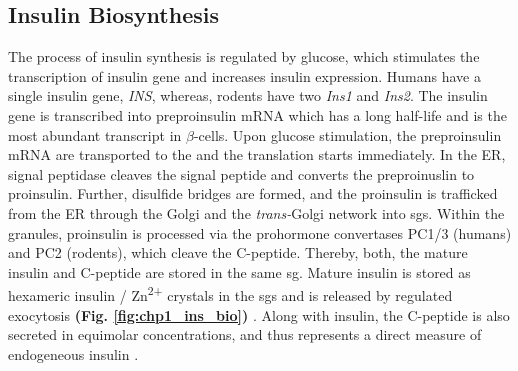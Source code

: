 \subsection{Insulin Biosynthesis} %
\label{sec:insbio}

The process of insulin synthesis is regulated by glucose, which stimulates the transcription of insulin gene and increases insulin  expression. Humans have a single insulin gene, \textit{INS}, whereas, rodents have two \textit{Ins1} and \textit{Ins2}. The insulin gene is transcribed into preproinsulin mRNA which has a long half-life and is the most abundant transcript in $\beta$-cells. Upon glucose stimulation, the preproinsulin mRNA are transported to the  and the translation starts immediately. In the ER, signal peptidase cleaves the signal peptide and converts the preproinuslin to proinsulin. Further, disulfide bridges are formed, and the proinsulin is trafficked from the ER through the Golgi and the \textit{trans-}Golgi network into \glspl{sg}. Within the granules, proinsulin is processed via the prohormone convertases PC1/3 (humans) and PC2 (rodents), which cleave the C-peptide. Thereby, both, the mature insulin and C-peptide are stored in the same \gls{sg}. Mature insulin is stored as hexameric insulin / Zn\textsuperscript{2+} crystals in the \glspl{sg} and is released by regulated exocytosis \textbf{(Fig. \ref{fig:chp1_ins_bio})} \textbf{\cite{vasiljevic_making_2020,tokarz_cell_2018}}. Along with insulin, the C-peptide is also secreted in equimolar concentrations, and thus represents a direct measure of endogeneous insulin \textbf{\cite{venugopal_biochemistry_2024}}. 

